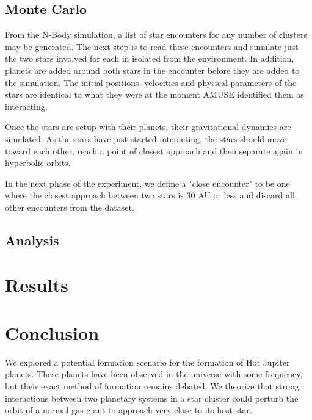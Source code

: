 \documentclass[12pt]{article}
\begin{document}


    

    \subsection{Monte Carlo}

    From the N-Body simulation, a list of star encounters for any number of 
    clusters may be generated. The next step is to read these encounters and
    simulate just the two stars involved for each in isolated from the 
    environment. In addition, planets are added around both stars in the
    encounter before they are added to the simulation. The initial positions,
    velocities and physical parameters of the stars are identical to what they
    were at the moment AMUSE identified them as interacting. 

    Once the stars are setup with their planets, their gravitational dynamics
    are simulated. As the stars have just started interacting, the stars should
    move toward each other, reach a point of closest approach and then separate again
    in hyperbolic orbits.

    In the next phase of the experiment, we define a "close encounter" to be
    one where the closest approach between two stars is 30 AU or less and discard
    all other encounters from the dataset. 


    \subsection{Analysis}



\section{Results}




\section{Conclusion}

We explored a potential formation scenario for the formation of Hot Jupiter
planets. These planets have been observed in the universe with some frequency,
but their exact method of formation remains debated. 
We theorize that strong interactions between two planetary systems in a star
cluster could perturb the orbit of a normal gas giant to approach very close to
its host star. 
\end{document}
